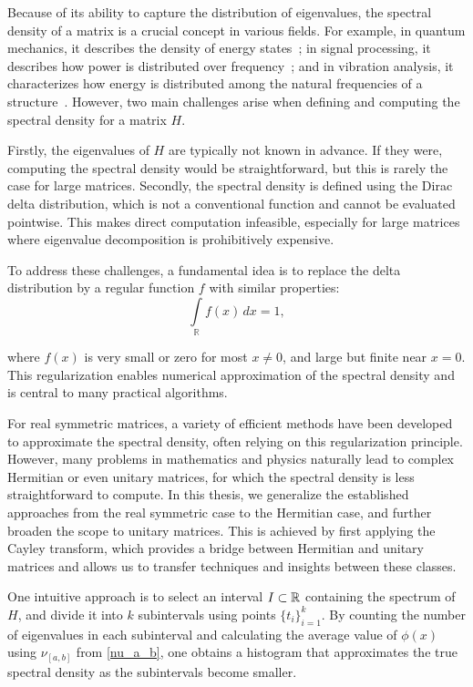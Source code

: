 Because of its ability to capture the distribution of eigenvalues, the spectral density of a matrix is a crucial concept in various fields. For example, in quantum mechanics, it describes the density of energy states~\cite{reichl,sakurainapolitano}; in signal processing, it describes how power is distributed over frequency~\cite{oppenheimschafer, mitra}; and in vibration analysis, it characterizes how energy is distributed among the natural frequencies of a structure~\cite{nortonkarczub}. However, two main challenges arise when defining and computing the spectral density for a matrix $H$.

Firstly, the eigenvalues of $H$ are typically not known in advance. If they were, computing the spectral density would be straightforward, but this is rarely the case for large matrices. Secondly, the spectral density is defined using the Dirac delta distribution, which is not a conventional function and cannot be evaluated pointwise. This makes direct computation infeasible, especially for large matrices where eigenvalue decomposition is prohibitively expensive.

To address these challenges, a fundamental idea is to replace the delta distribution by a regular function $f$ with similar properties:
\begin{equation} \label{integral_equals_one}
    \int\limits_{\mathbb{R}} f(x)\, dx = 1,
\end{equation}

where $f(x)$ is very small or zero for most $x \neq 0$, and large but finite near $x = 0$. This regularization enables numerical approximation of the spectral density and is central to many practical algorithms.

For real symmetric matrices, a variety of efficient methods have been developed to approximate the spectral density,
often relying on this regularization principle.
However, many problems in mathematics and physics naturally lead to complex Hermitian or even unitary matrices,
for which the spectral density is less straightforward to compute.
In this thesis, we generalize the established approaches from the real symmetric case to the Hermitian case,
and further broaden the scope to unitary matrices.
This is achieved by first applying the Cayley transform, which provides a bridge between Hermitian and unitary matrices
and allows us to transfer techniques and insights between these classes.

One intuitive approach is to select an interval $I \subset \mathbb{R}$ containing the spectrum of $H$,
and divide it into $k$ subintervals using points $\{t_i\}_{i=1}^k$.
By counting the number of eigenvalues in each subinterval
and calculating the average value of $\phi(x)$ using $\nu_{[a, b]}$ from \eqref{nu_a_b},
one obtains a histogram that approximates the true spectral density as the subintervals become smaller.

